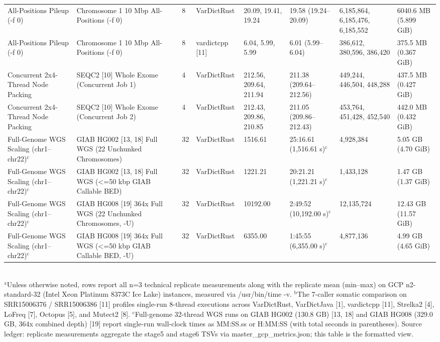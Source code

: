 \begin{table}[htbp]
{\begin{tabular}{llllllll}
All-Positions Pileup (-f 0) & Chromosome 1 10 Mbp All-Positions (-f 0) & 8 & VarDictRust & 20.09, 19.41, 19.24 & 19.58 (19.24--20.09) & 6,185,864, 6,185,476, 6,185,552 & 6040.6 MB (5.899 GiB) \\
All-Positions Pileup (-f 0) & Chromosome 1 10 Mbp All-Positions (-f 0) & 8 & vardictcpp [11] & 6.04, 5.99, 5.99 & 6.01 (5.99--6.04) & 386,612, 380,596, 386,420 & 375.5 MB (0.367 GiB) \\
Concurrent 2x4-Thread Node Packing & SEQC2 [10] Whole Exome (Concurrent Job 1) & 4 & VarDictRust & 212.56, 209.64, 211.94 & 211.38 (209.64--212.56) & 449,244, 446,504, 448,288 & 437.5 MB (0.427 GiB) \\
Concurrent 2x4-Thread Node Packing & SEQC2 [10] Whole Exome (Concurrent Job 2) & 4 & VarDictRust & 212.43, 209.86, 210.85 & 211.05 (209.86--212.43) & 453,764, 451,428, 452,540 & 442.0 MB (0.432 GiB) \\
Full-Genome WGS Scaling (chr1--chr22)$^{\text{c}}$ & GIAB HG002 [13, 18] Full WGS (22 Unchunked Chromosomes) & 32 & VarDictRust & 1516.61 & 25:16.61 (1,516.61 s)$^{\text{c}}$ & 4,928,384 & 5.05 GB (4.70 GiB) \\
Full-Genome WGS Scaling (chr1--chr22)$^{\text{c}}$ & GIAB HG002 [13, 18] Full WGS (\textless{}=50 kbp GIAB Callable BED) & 32 & VarDictRust & 1221.21 & 20:21.21 (1,221.21 s)$^{\text{c}}$ & 1,433,128 & 1.47 GB (1.37 GiB) \\
Full-Genome WGS Scaling (chr1--chr22)$^{\text{c}}$ & GIAB HG008 [19] 364x Full WGS (22 Unchunked Chromosomes, -U) & 32 & VarDictRust & 10192.00 & 2:49:52 (10,192.00 s)$^{\text{c}}$ & 12,135,724 & 12.43 GB (11.57 GiB) \\
Full-Genome WGS Scaling (chr1--chr22)$^{\text{c}}$ & GIAB HG008 [19] 364x Full WGS (\textless{}=50 kbp GIAB Callable BED, -U) & 32 & VarDictRust & 6355.00 & 1:45:55 (6,355.00 s)$^{\text{c}}$ & 4,877,136 & 4.99 GB (4.65 GiB) \\
\hline
\end{tabular}%
}
\\[4pt]\footnotesize{$^{\text{a}}$Unless otherwise noted, rows report all n=3 technical replicate measurements along with the replicate mean (min--max) on GCP n2-standard-32 (Intel Xeon Platinum 8373C Ice Lake) instances, measured via /usr/bin/time -v. $^{\text{b}}$The 7-caller somatic comparison on SRR15006376 / SRR15006386 [11] profiles single-run 8-thread executions across VarDictRust, VarDictJava [1], vardictcpp [11], Strelka2 [4], LoFreq [7], Octopus [5], and Mutect2 [8]. $^{\text{c}}$Full-genome 32-thread WGS runs on GIAB HG002 (130.8 GB) [13, 18] and GIAB HG008 (329.0 GB, 364x combined depth) [19] report single-run wall-clock times as MM:SS.ss or H:MM:SS (with total seconds in parentheses). Source ledger: replicate measurements aggregate the stage5 and stage6 TSVs via master\_gcp\_metrics.json; this table is the formatted view.}
\end{table}
